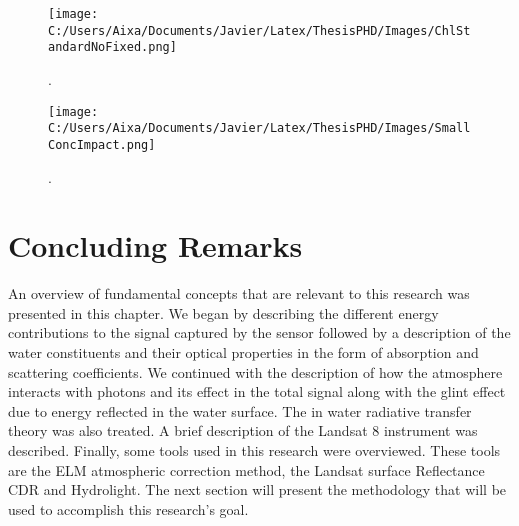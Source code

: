 \begin{figure}[htb]
\centering
      \texttt{[image: C:/Users/Aixa/Documents/Javier/Latex/ThesisPHD/Images/ChlStandardNoFixed.png]}
      \caption{.\label{fig:ChlStandardNoFixed} } 
\end{figure}

\begin{figure}[htb]
\centering
      \texttt{[image: C:/Users/Aixa/Documents/Javier/Latex/ThesisPHD/Images/SmallConcImpact.png]}
      \caption{.\label{fig:SmallConcImpact} } 
\end{figure}



\section{Concluding Remarks}
An overview of fundamental concepts that are relevant to this research was presented in this chapter. We began by describing the different energy contributions to the signal captured by the sensor followed by a description of the water constituents and their optical properties in the form of absorption and scattering coefficients. We continued with the description of how the atmosphere interacts with photons and its effect in the total signal along with the glint effect due to energy reflected in the water surface. The in water radiative transfer theory was also treated. A brief description of the Landsat 8 instrument was described. Finally, some tools used in this research were overviewed. These tools are the ELM atmospheric correction method, the Landsat surface Reflectance CDR and Hydrolight. The next section will present the methodology that will be used to accomplish this research's goal.
